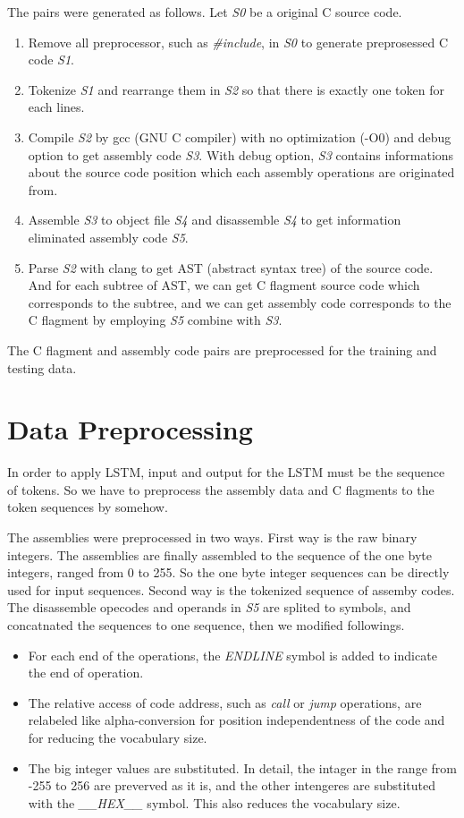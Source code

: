 \documentclass[senior,final,11pt]{iscs-thesis}
\begin{document}
The pairs were generated as follows. Let {\sl S0} be a original C source code.
\begin{enumerate}
\item Remove all preprocessor, such as {\sl \#include}, in {\sl S0} to generate preprosessed C code {\sl S1}. 
\item Tokenize {\sl S1} and rearrange them in {\sl S2} so that there is exactly one token for each lines. 
\item 
Compile {\sl S2} by gcc (GNU C compiler) with no optimization (-O0) and debug option to get assembly code {\sl S3}. 
With debug option, {\sl S3} contains informations about the source code position which each assembly operations are originated from.
\item Assemble {\sl S3} to object file {\sl S4} and disassemble {\sl S4} to get information eliminated assembly code {\sl S5}.
\item 
Parse {\sl S2} with clang to get AST (abstract syntax tree) of the source code. 
And for each subtree of AST, we can get C flagment source code which corresponds to the subtree, 
and we can get assembly code corresponds to the C flagment by employing {\sl S5} combine with {\sl S3}.
\end{enumerate}

The C flagment and assembly code pairs are preprocessed for the training and testing data.


\section{Data Preprocessing}
In order to apply LSTM, input and output for the LSTM must be the sequence of tokens. 
So we have to preprocess the assembly data and C flagments to the token sequences by somehow.

The assemblies were preprocessed in two ways.
First way is the raw binary integers. The assemblies are finally assembled to the sequence of the one byte integers, ranged from 0 to 255.
So the one byte integer sequences can be directly used for input sequences.
Second way is the tokenized sequence of assemby codes. 
The disassemble opecodes and operands in {\sl S5} are splited to symbols, and concatnated the sequences to one sequence, then we modified followings.
\begin{itemize}
\item For each end of the operations, the {\sl ENDLINE} symbol is added to indicate the end of operation.
\item 
The relative access of code address, such as {\sl call} or {\sl jump} operations, 
are relabeled like alpha-conversion for position independentness of the code and for reducing the vocabulary size.
\item The big integer values are substituted. 
In detail, the intager in the range from -255 to 256 are preverved as it is, and the other intengeres are substituted with the {\sl \_\_HEX\_\_} symbol.
This also reduces the vocabulary size.
\end{itemize}
\end{document}
